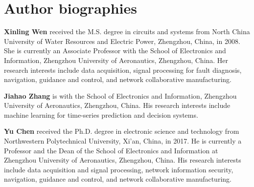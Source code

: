 
\section*{Author biographies}

\textbf{Xinling Wen} received the M.S. degree in circuits and systems from
North China University of Water Resources and Electric Power, Zhengzhou, China,
in 2008. She is currently an Associate Professor with the School of Electronics
and Information, Zhengzhou University of Aeronautics, Zhengzhou, China. Her
research interests include data acquisition, signal processing for fault
diagnosis, navigation, guidance and control, and network collaborative
manufacturing.

\textbf{Jiahao Zhang} is with the School of Electronics and Information,
Zhengzhou University of Aeronautics, Zhengzhou, China. His research interests
include machine learning for time-series prediction and decision systems.

\textbf{Yu Chen} received the Ph.D. degree in electronic science and technology
from Northwestern Polytechnical University, Xi'an, China, in 2017. He is
currently a Professor and the Dean of the School of Electronics and Information
at Zhengzhou University of Aeronautics, Zhengzhou, China. His research
interests include data acquisition and signal processing, network information
security, navigation, guidance and control, and network collaborative
manufacturing.
